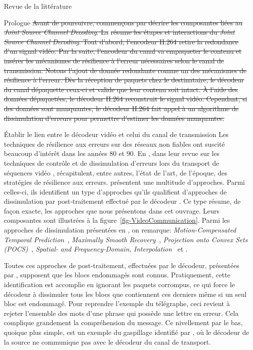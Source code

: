 \documentclass[letterpaper, twoside, 12pt,memoire]{thETS}
\newcommand{\fig}[1]{figure~\ref{#1}}
\providecommand{\DIFdel}[1]{{\protect\color{red}\sout{#1}}}                      %
\providecommand{\DIFdelbegin}{} %
\providecommand{\DIFdelend}{} %
\begin{document}
\begin{chapter}{Revue de la littérature}
\begin{section}{Prologue}
\DIFdelbegin \DIFdel{Avant de poursuivre, commençons par décrire les composantes liées au
\textit{Joint Source Channel Decoding}. La }%
\DIFdel{résume
les étapes et interactions du \textit{Joint Source Channel Decoding}. Tout
d'abord, l'encodeur H.264 retire la redondance d'un signal vidéo. Par la suite,
l'encodeur du canal va empaqueter le contenu et insérer les mécanismes de
résilience à l'erreur nécessaires selon le canal de transmission. Notons l'ajout
de donnée redondante comme un des mécanismes de résilience à l'erreur. Dès la
réception de paquets chez le destinataire, le décodeur du canal dépaquette
ceux-ci et valide que leur contenu soit intact. À l'aide des données
dépaquetées, le décodeur H.264 reconstruit le signal vidéo. Cependant, si des
données sont manquantes, le décodeur H.264 fait appel à un algorithme de dissimulation d'erreurs pour permettre d'estimer les données manquantes.
}\DIFdelend \end{section}

\begin{section}{Établir le lien entre le décodeur vidéo et celui du canal de
transmission}
\label{sect-SourceChannel}
Les techniques de résilience aux erreurs sur des réseaux non fiables ont suscité
beaucoup d'intérêt dans les années 80 et 90. En \citeyear{Wang1998}, dans leur
revue sur les techniques de contrôle et de dissimulation d'erreurs lors du
transport de séquences vidéo \citep{Wang1998}, \citeauthor{Wang1998}
récapitulent, entre autres, l'état de l'art, de l'époque, des stratégies de
résilience aux erreurs. \citeauthor{Wang1998} présentent une multitude
d'approches. Parmi celles-ci, ils identifient un type d'approches qu'ils
qualifient d'approches de dissimulation par post-traitement effectué par le
décodeur \citep[Chap. 5]{Wang1998}. Ce type résume, de façon exacte, les
approches que nous présentons dans cet ouvrage. Leurs composantes sont
illustrées à la \fig{fig-VideoCommunication}. Parmi les approches de
dissimulation présentées en \citeyear{Wang1998}, on remarque:
\textit{Motion-Compensated Temporal Prediction}~\citep{Ghanbari1993},
\textit{Maximally Smooth Recovery}~\citep{Wang1993}, \textit{Projection onto
Convex Sets (POCS)}~\citep{Sun1995}, \textit{Spatial- and Frequency-Domain,
Interpolation}~\citep{Hemami1995} et \citep{Sun1992}.

Toutes ces approches de post-traitement, effectuées par le décodeur, présentées
par \citet{Wang1998}, supposent que les blocs endommagés sont connus.
Pratiquement, cette identification est accomplie en ignorant les paquets
corrompus, ce qui force le décodeur à dissimuler tous les blocs que contiennent
ces derniers même si un seul bloc est endommagé. Pour reprendre l'exemple du télégraphe, ceci revient à rejeter
l'ensemble des mots d'une phrase qui possède une lettre en erreur. Cela complique
grandement la compréhension du message. Ce nivellement par le bas, quoique plus
simple, est un exemple du gaspillage identifié par \citeauthor{Modestino1979},
où le décodeur de la source ne communique pas avec le décodeur du canal de
transport.


\end{section}
\end{chapter}
\end{document}

